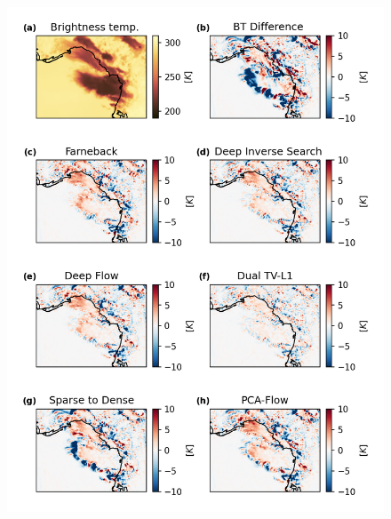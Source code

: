 \begin{figure}[t]
    \includegraphics[width=\textwidth]{figures/chapter1_11.png}
    \caption[
    A comparison of the Lagrangian change in \acrshort{bt} using different optical flow methods  
    ]{}
    \label{fig:opt_flow_differences}
\end{figure}

